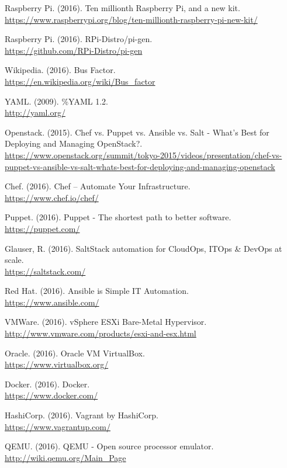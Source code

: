 \documentclass[12pt,a4paper]{report}
\begin{document}
\begin{thebibliography}{9}
Raspberry Pi. (2016). Ten millionth Raspberry Pi, and a new kit.
\\\url{https://www.raspberrypi.org/blog/ten-millionth-raspberry-pi-new-kit/}


Raspberry Pi. (2016). RPi-Distro/pi-gen.
\\\url{https://github.com/RPi-Distro/pi-gen}

Wikipedia. (2016). Bus Factor.
\\\url{https://en.wikipedia.org/wiki/Bus_factor}

YAML. (2009). \%YAML 1.2.
\\\url{http://yaml.org/}


Openstack. (2015). Chef vs. Puppet vs. Ansible vs. Salt - What's Best for Deploying and Managing OpenStack?.
\\\url{https://www.openstack.org/summit/tokyo-2015/videos/presentation/chef-vs-puppet-vs-ansible-vs-salt-whats-best-for-deploying-and-managing-openstack}

Chef. (2016). Chef – Automate Your Infrastructure.
\\\url{https://www.chef.io/chef/}

Puppet. (2016). Puppet - The shortest path to better software.
\\\url{https://puppet.com/}

Glauser, R. (2016). SaltStack automation for CloudOps, ITOps \& DevOps at scale.
\\\url{https://saltstack.com/}

Red Hat. (2016). Ansible is Simple IT Automation.
\\\url{https://www.ansible.com/}

VMWare. (2016). vSphere ESXi Bare-Metal Hypervisor.
\\\url{http://www.vmware.com/products/esxi-and-esx.html}

Oracle. (2016). Oracle VM VirtualBox.
\\\url{https://www.virtualbox.org/}

Docker. (2016). Docker.
\\\url{https://www.docker.com/}

HashiCorp. (2016). Vagrant by HashiCorp.
\\\url{https://www.vagrantup.com/}

QEMU. (2016). QEMU - Open source processor emulator.
\\\url{http://wiki.qemu.org/Main_Page}

\end{thebibliography}
\end{document}
